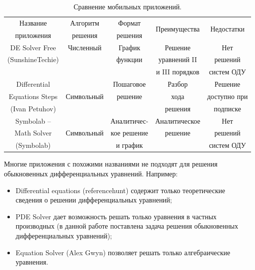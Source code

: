 \documentclass[14pt,russian]{extarticle}
\begin{document}
\begin{table}[H]
\caption{Сравнение мобильных приложений.\label{table:apps_comparison}}
\begin{center}
\begin{tabular}{|c|c|c|c|c|}
\hline 
Название                                    & Алгоритм           &  Формат &  \multirow{2}{*}{Преимущества}     & \multirow{2}{*}{Недостатки} \\
приложения                               &решения              & решения &&\\
\hline 
DE Solver Free                             &   Численный        & График             & Решение                   &  Нет  \\
(SunshineTechie)                        &                                 &     функции        &   уравнений  II       & решений \\
                                                      &                                &                            &  и III порядков       & систем ОДУ\\
\hline
Differential                                   &                               & Пошаговое           & Разбор                & Решение  \\
Equations Steps                          &    Символьный     &     решение           &   хода                  & доступно при \\
(Ivan Petuhov)                            &                                &                                &  решения            & подписке\\
\hline
Symbolab --                                   &                               & Аналитичес-& Аналитическое     & Нет \\
Math Solver                            &    Символьный     &   кое  решение&  решение                & решений  \\
(Symbolab)                            &                                &   и   график&                               & систем ОДУ\\
\hline

\end{tabular} 
\end{center}
\end{table}

Многие приложения с похожими названиями не подходят для решения обыкновенных дифференциальных уравнений. Например:
\begin{itemize}
\item Differential equations (referencehunt) содержит только теоретические сведения о решении дифференциальных уравнений;
\item PDE Solver дает возможность решать только уравнения в частных производных (в данной работе поставлена задача решения обыкновенных дифференциальных уравнений);
\item Equation Solver (Alex Gwyn) позволяет решать только алгебраические уравнения.
\end{itemize}
\end{document}

